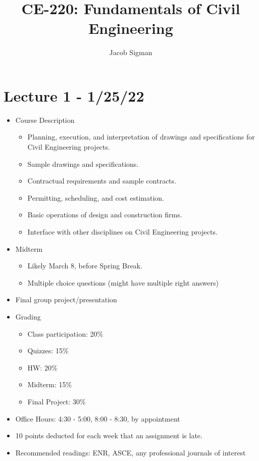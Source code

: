\documentclass{article}
\title{CE-220: Fundamentals of Civil Engineering}
\author{Jacob Sigman}
\date{}
\begin{document}
\maketitle
\section*{Lecture 1 - 1/25/22}
\begin{itemize}
    \item Course Description
    \begin{itemize}
        \item Planning, execution, and interpretation of drawings and specifications for Civil Engineering projects.
        \item Sample drawings and specifications.
        \item Contractual requirements and sample contracts.
        \item Permitting, scheduling, and cost estimation.
        \item Basic operations of design and construction firms.
        \item Interface with other disciplines on Civil Engineering projects.
    \end{itemize}
    \item Midterm
    \begin{itemize}
        \item Likely March 8, before Spring Break.
        \item Multiple choice questions (might have multiple right answers)
    \end{itemize}
    \item Final group project/presentation
    \item Grading
    \begin{itemize}
        \item Class participation: 20\%
        \item Quizzes: 15\%
        \item HW: 20\%
        \item Midterm: 15\%
        \item Final Project: 30\%
    \end{itemize}
    \item Office Hours: 4:30 - 5:00, 8:00 - 8:30, by appointment
    \item 10 points deducted for each week that an assignment is late.
    \item Recommended readings: ENR, ASCE, any professional journals of interest

\end{itemize}
\end{document}

